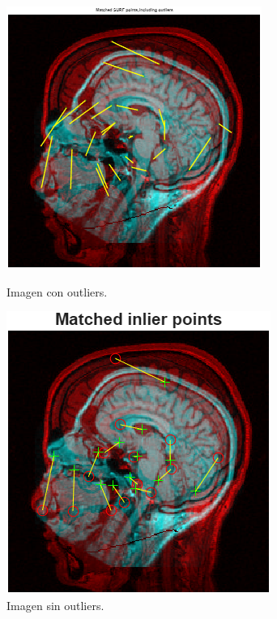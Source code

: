 \documentclass[11pt, letterpaper]{article}
\begin{document}
\begin{figure}[h!]
	\centering
	\begin{minipage}{0.48\textwidth} %
		\centering
		\includegraphics[width=\textwidth]{R2.png}
		\caption{Imagen con outliers.}
		\label{fig:im2}
	\end{minipage}\hfill %
	\begin{minipage}{0.48\textwidth} %
		\centering
		\includegraphics[width=\textwidth]{R3.png}
		\caption{Imagen sin outliers.}
		\label{fig:im2.2}
	\end{minipage}
\end{figure}
\end{document}
